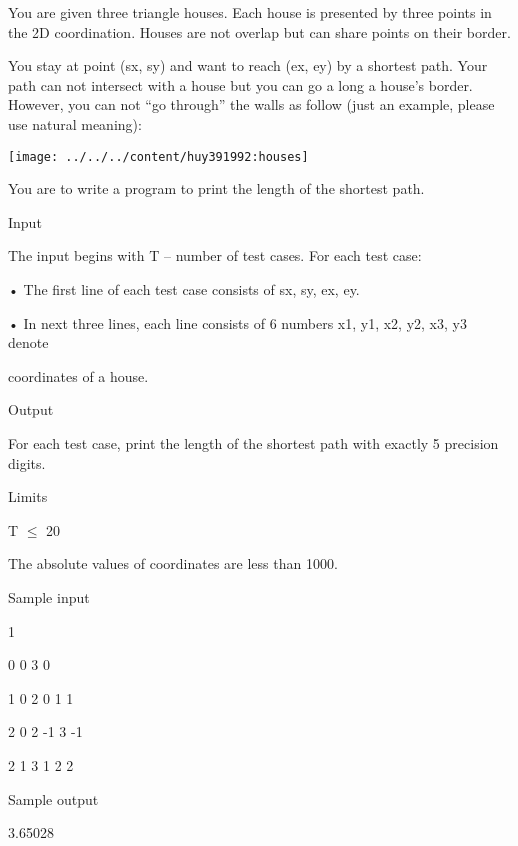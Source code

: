 



   You are given three triangle houses. Each house is presented by three points in the 2D coordination. Houses are not overlap but can share points on their border.  

   You stay at point (sx, sy) and want to reach (ex, ey) by a shortest path. Your path can not intersect with a house but you can go a long a house’s border. However, you can not “go through” the walls as follow (just an example, please use natural meaning):  


\texttt{[image: ../../../content/huy391992:houses]}

   You are to write a program to print the length of the shortest path.  




   Input   


   The input begins with T – number of test cases. For each test case:   


   • The first line of each test case consists of sx, sy, ex, ey.   


   • In next three lines, each line consists of 6 numbers x1, y1, x2, y2, x3, y3 denote   


   coordinates of a house.  




   Output   


   For each test case, print the length of the shortest path with exactly 5 precision digits.  




   Limits   


   T  $\le$  20   


   The absolute values of coordinates are less than 1000.  




   Sample input   


   1   


   0 0 3 0   


   1 0 2 0 1 1   


   2 0 2 -1 3 -1   


   2 1 3 1 2 2  




   Sample output   


   3.65028  
